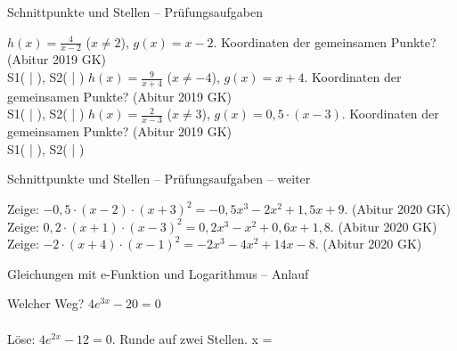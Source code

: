 \begin{aufgabe}{Schnittpunkte und Stellen – Prüfungsaufgaben}
\begin{teile}
\teil $h(x) = \frac{4}{x - 2}$ ($x \ne 2$), $g(x) = x - 2$. Koordinaten der gemeinsamen Punkte? \hfill (Abitur 2019 GK) \\ S1( \leerfeld | \leerfeld ), S2( \leerfeld | \leerfeld )
\teil $h(x) = \frac{9}{x + 4}$ ($x \ne -4$), $g(x) = x + 4$. Koordinaten der gemeinsamen Punkte? \hfill (Abitur 2019 GK) \\ S1( \leerfeld | \leerfeld ), S2( \leerfeld | \leerfeld )
\teil $h(x) = \frac{2}{x - 3}$ ($x \ne 3$), $g(x) = 0{,}5 \cdot (x - 3)$. Koordinaten der gemeinsamen Punkte? \hfill (Abitur 2019 GK) \\ S1( \leerfeld | \leerfeld ), S2( \leerfeld | \leerfeld )
\end{teile}
\end{aufgabe}

\begin{aufgabe}{Schnittpunkte und Stellen – Prüfungsaufgaben – weiter}
\begin{teile}
\teil Zeige: $-0{,}5 \cdot (x - 2) \cdot (x + 3)^2 = -0{,}5x^3 - 2x^2 + 1{,}5x + 9$. \hfill (Abitur 2020 GK)
\teil Zeige: $0{,}2 \cdot (x + 1) \cdot (x - 3)^2 = 0{,}2x^3 - x^2 + 0{,}6x + 1{,}8$. \hfill (Abitur 2020 GK)
\teil Zeige: $-2 \cdot (x + 4) \cdot (x - 1)^2 = -2x^3 - 4x^2 + 14x - 8$. \hfill (Abitur 2020 GK)
\end{teile}
\end{aufgabe}

\begin{aufgabe}{Gleichungen mit e-Funktion und Logarithmus – Anlauf}
\begin{teile}
\teil Welcher Weg? $4e^{3x} - 20 = 0$  \\  \\ 
\teil Löse: $4e^{2x} - 12 = 0$. Runde auf zwei Stellen. x = \leerfeld
\end{teile}
\end{aufgabe}

